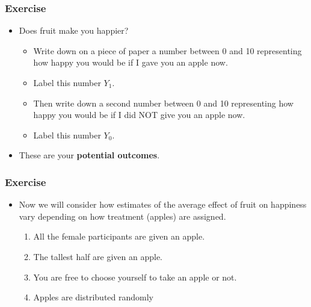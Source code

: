\documentclass[xcolor=x11names,compress]{beamer}\usepackage[]{graphicx}\usepackage[]{color}
\renewcommand{\(}{\begin{columns}}
\renewcommand{\)}{\end{columns}}
\newcommand{\<}[1]{\begin{column}{#1}}
\renewcommand{\>}{\end{column}}
\begin{document}
\begin{frame}
\frametitle{Exercise}
\begin{itemize}
\item Does fruit make you happier? 
\begin{itemize}
\item Write down on a piece of paper a number between 0 and 10 representing how happy you would be if I gave you an apple now. 
\item Label this number $Y_1$.
\item Then write down a second number between 0 and 10 representing how happy you would be if I did NOT give you an apple now. 
\item Label this number $Y_0$.
\end{itemize}
\item These are your \textbf{potential outcomes}.
\end{itemize}
\end{frame}

\begin{frame}
\frametitle{Exercise}
\begin{itemize}
\item Now we will consider how estimates of the average effect of fruit on happiness vary depending on how treatment (apples) are assigned.
\begin{enumerate}
\item All the female participants are given an apple.
\item The tallest half are given an apple.
\item You are free to choose yourself to take an apple or not.
\item Apples are distributed randomly
\end{enumerate}
\end{itemize}
\end{frame}
\end{document}
